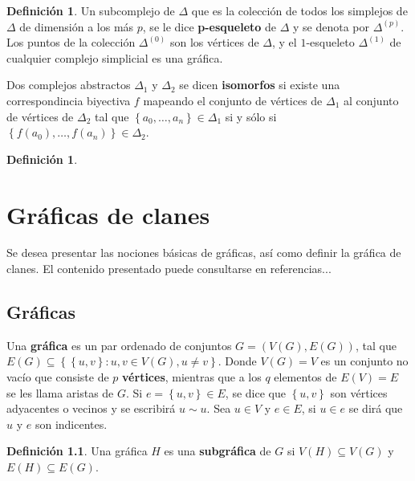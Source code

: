 \documentclass[12pt]{book}
\theoremstyle{definition}
\newtheorem{definition}[theorem]{Definición}
\newcounter{in}
\newcounter{ini}
\begin{document}
\begin{definition}
  \label{psk}
  Un subcomplejo de $\Delta$ que es la colección de todos los
  simplejos de $\Delta$ de dimensión a los más $p$, se le dice
  \textbf{p-esqueleto} de $\Delta$ y se denota por
  $\Delta^{(p)}$. Los puntos de la colección $\Delta^{(0)}$ son los
  vértices de $\Delta$, y el $1$-esqueleto $\Delta^{(1)}$ de cualquier
  complejo simplicial es una gráfica.
\end{definition}

Dos complejos abstractos $\Delta_{1}$ y $\Delta_{2}$ se dicen
\textbf{isomorfos} si existe una correspondincia biyectiva
$f$ mapeando el conjunto de vértices de $\Delta_{1}$ al conjunto de
vértices de $\Delta_{2}$ tal que
$\left\{ a_{0}, \ldots, a_{n} \right\} \in \Delta_{1}$ si y sólo si
$\left\{ f(a_{0}), \ldots, f(a_{n}) \right\} \in \Delta_{2}$.



\begin{definition}
  \label{v_s}
  
\end{definition}
\chapter{Gráficas de clanes}
\label{cha:Graficas_clanes}

Se desea presentar las nociones básicas de gráficas, así como definir
la gráfica de clanes. El contenido presentado puede consultarse en
referencias...

\section{Gráficas}
\label{sec:graficas}

Una \textbf{gráfica} es un par ordenado de conjuntos
$G = (V(G), E(G))$, tal que
$E(G) \subseteq \left\{ \left\{ u,v \right\} \colon u,v \in V(G), u
  \neq v \right\}$. Donde $V(G) = V$ es un conjunto no vacío que
consiste de $p$ \textbf{vértices}, mientras que a los $q$ elementos de
$E(V) = E$ se les llama aristas de $G$. Si
$e = \left\{ u,v \right\} \in E$, se dice que $\left\{ u,v \right\}$
son vértices adyacentes o vecinos y se escribirá $u \sim u$.  Sea
$u \in V$ y $e \in E$, si $u \in e$ se dirá que $u$ y $e$ son
indicentes.

\begin{definition}
  \label{sub_graph}
  Una gráfica $H$ es una \textbf{subgráfica} de $G$ si
  $V(H) \subseteq V(G)$ y $E(H) \subseteq E(G)$.
\end{definition}
\end{document}
